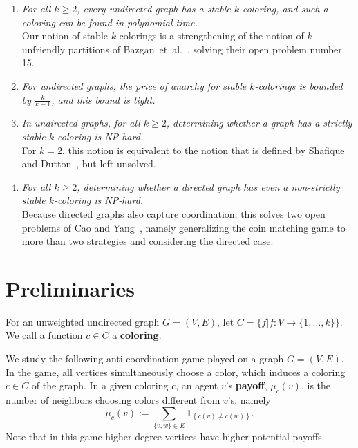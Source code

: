 \documentclass{llncs}
\newcommand{\ind}[1]{\textbf{1}_{\left \{ #1 \right \}}}
\begin{document}
\begin{enumerate}

\item \emph{For all $k \ge 2$, every undirected graph has a stable
$k$-coloring, and such a coloring can be found in polynomial time.}  \\ Our
notion of stable $k$-colorings is a strengthening of the notion of
$k$-unfriendly partitions of Bazgan~et~al.~\cite{BazganTV10}, solving their
open problem number 15.

\item \emph{For undirected graphs, the price of anarchy for stable $k$-colorings is
bounded by $\frac{k}{k-1}$, and this bound is tight.}

\item \emph{In undirected graphs, for all $k \ge 2$, determining whether a
graph has a strictly stable $k$-coloring is NP-hard.}  \\ For $k=2$, this
notion is equivalent to the notion that is defined by Shafique and
Dutton~\cite{ShafiqueD09}, but left unsolved.

\item \emph{For all $k \ge 2$, determining whether a directed graph has even a
non-strictly stable $k$-coloring is NP-hard.}\\  Because directed graphs also
capture coordination, this solves two open problems of Cao and
Yang~\cite{CaoY12a}, namely generalizing the coin matching game to more than
two strategies and considering the directed case. 

\end{enumerate}



\section{Preliminaries}

For an unweighted undirected graph $G=(V,E)$, let $C = \{f | f: V
\to \{1, \ldots ,k \}\}.$ We call a function $c \in C$ a \textbf{coloring}.

We study the following anti-coordination game played on a graph $G=(V,E)$.  In
the game, all vertices simultaneously choose a color, which induces a coloring
$c \in C$ of the graph.  In a given coloring $c$, an agent $v$'s
\textbf{payoff}, $\mu_c(v)$, is the number of neighbors choosing colors
different from $v$'s, namely 
\[ 
   \mu_c(v) := \sum_{\{v,w\} \in E} \ind{c(v) \neq c(w)}.  
\] 
Note that in this game higher degree vertices have higher potential payoffs.
\end{document}
